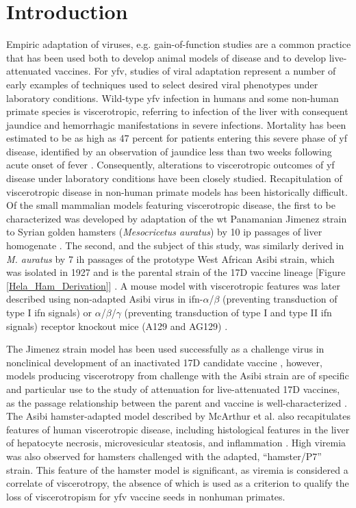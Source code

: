 \section{Introduction}
Empiric adaptation of viruses, e.g. gain-of-function studies are a common practice that has been used both to develop animal models of disease and to develop live-attenuated vaccines. For \gls{yfv}, studies of viral adaptation represent a number of early examples of techniques used to select desired viral phenotypes under laboratory conditions. Wild-type \gls{yfv} infection in humans and some non-human primate species is viscerotropic, referring to infection of the liver with consequent jaundice and hemorrhagic manifestations in severe infections. Mortality has been estimated to be as high as 47 percent for patients entering this severe phase of \gls{yf} disease, identified by an observation of jaundice less than two weeks following acute onset of fever \parencite{Johansson:2014hv,WorldHealthOrganization:2003tq}. Consequently, alterations to viscerotropic outcomes of \gls{yf} disease under laboratory conditions have been closely studied. Recapitulation of viscerotropic disease in non-human primate models has been historically difficult.  Of the small mammalian models featuring viscerotropic disease, the first to be characterized was developed by adaptation of the \gls{wt} Panamanian Jimenez strain to Syrian golden hamsters (\emph{Mesocricetus auratus}) by 10 \gls{ip} passages of liver homogenate \parencite{Tesh:2001ec,Xiao:2001fu}. The second, and the subject of this study, was similarly derived in \emph{M. auratus} by 7 \gls{ih} passages of the prototype West African Asibi strain, which was isolated in 1927 and is the parental strain of the 17D vaccine lineage [Figure \ref{Hela_Ham_Derivation}] \parencite{McArthur:2003fv}. A mouse model with viscerotropic features was later described using non-adapted Asibi virus in \gls{ifn}-$\alpha$/$\beta$ (preventing transduction of type I \gls{ifn} signals) or $\alpha$/$\beta$/$\gamma$ (preventing transduction of type I and type II \gls{ifn} signals) receptor knockout mice (A129 and AG129) \parencite{Meier:2009ij}.

The Jimenez strain model has been used successfully as a challenge virus in nonclinical development of an inactivated 17D candidate vaccine \parencite{Monath:2010bu}, however, models producing viscerotropy from challenge with the Asibi strain are of specific and particular use to the study of attenuation for live-attenuated 17D vaccines, as the passage relationship between the parent and vaccine is well-characterized \parencite{WorldHealthOrganization:2010wo,Theiler:1937wy}. The Asibi hamster-adapted model described by McArthur et al. also recapitulates features of human viscerotropic disease, including histological features in the liver of hepatocyte necrosis, microvesicular steatosis, and inflammation \parencite{McArthur:2003fv}. High viremia was also observed for hamsters challenged with the adapted, “hamster/P7” strain. This feature of the hamster model is significant, as viremia is considered a correlate of viscerotropy, the absence of which is used as a criterion to qualify the loss of viscerotropism for \gls{yfv} vaccine seeds in nonhuman primates. 

